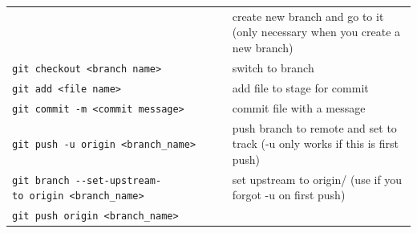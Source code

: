 \documentclass[]{book}
\begin{document}
\begin{longtable}[]{@{}ll@{}}
\begin{minipage}[t]{0.34\columnwidth}
\end{minipage} & \begin{minipage}[t]{0.60\columnwidth}\raggedright
create new branch and go to it (only necessary when you create a new branch)\strut
\end{minipage}\tabularnewline
\begin{minipage}[t]{0.34\columnwidth}\raggedright
\texttt{git\ checkout\ \textless{}branch\ name\textgreater{}}\strut
\end{minipage} & \begin{minipage}[t]{0.60\columnwidth}\raggedright
switch to branch\strut
\end{minipage}\tabularnewline
\begin{minipage}[t]{0.34\columnwidth}\raggedright
\texttt{git\ add\ \textless{}file\ name\textgreater{}}\strut
\end{minipage} & \begin{minipage}[t]{0.60\columnwidth}\raggedright
add file to stage for commit\strut
\end{minipage}\tabularnewline
\begin{minipage}[t]{0.34\columnwidth}\raggedright
\texttt{git\ commit\ -m\ \textless{}commit\ message\textgreater{}}\strut
\end{minipage} & \begin{minipage}[t]{0.60\columnwidth}\raggedright
commit file with a message\strut
\end{minipage}\tabularnewline
\begin{minipage}[t]{0.34\columnwidth}\raggedright
\texttt{git\ push\ -u\ origin\ \textless{}branch\_name\textgreater{}}\strut
\end{minipage} & \begin{minipage}[t]{0.60\columnwidth}\raggedright
push branch to remote and set to track (-u only works if this is first push)\strut
\end{minipage}\tabularnewline
\begin{minipage}[t]{0.34\columnwidth}\raggedright
\texttt{git\ branch\ -\/-set-upstream-to\ origin\ \textless{}branch\_name\textgreater{}}\strut
\end{minipage} & \begin{minipage}[t]{0.60\columnwidth}\raggedright
set upstream to origin/ (use if you forgot -u on first push)\strut
\end{minipage}\tabularnewline
\begin{minipage}[t]{0.34\columnwidth}\raggedright
\texttt{git\ push\ origin\ \textless{}branch\_name\textgreater{}}\strut

\end{minipage}
\end{longtable}
\end{document}
